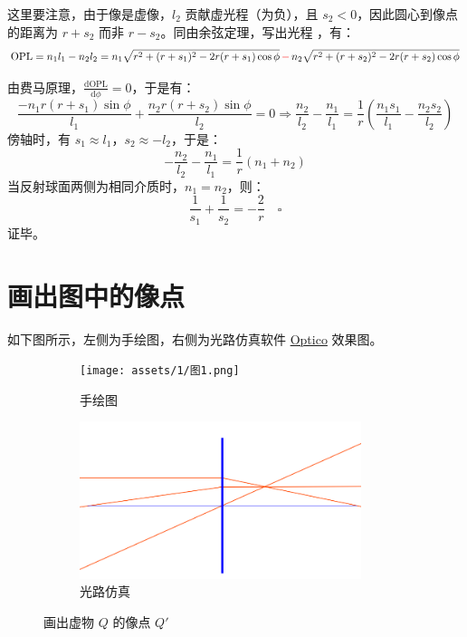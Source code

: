 \documentclass[UTF8]{report}
\theoremstyle{MyLineTheoremStyle} %
\theoremstyle{MyBlockTheoremStyle} %
\theoremstyle{MySubsubsectionStyle} %
\begin{document}
这里要注意，由于像是虚像，$l_2$ 贡献虚光程（为负），且 $s_2<0$，因此圆心到像点的距离为 $r+s_2$ 而非 $r-s_2$。同由余弦定理，写出光程 ，有：
\begin{equation}
\text{OPL} = n_1l_1 - n_2l_2 
=
n_1\sqrt{r^2 + (r+s_1)^2 - 2r(r+s_1)\cos \phi } \,{\color{red} -}\, n_2 \sqrt{r^2 + (r+s_2)^2 - 2r(r+s_2)\cos \phi } 
\end{equation}

由费马原理，$\frac{\mathrm{d} \text{OPL}  }{\mathrm{d} \phi } = 0$，于是有：
\begin{equation}
\frac{-n_1r(r+s_1)\sin \phi }{l_1} + \frac{n_2r(r+s_2)\sin \phi }{l_2} = 0 
\Longrightarrow 
\frac{n_2}{l_2} - \frac{n_1}{l_1} = \frac{1}{r}\left( \frac{n_1s_1}{l_1} - \frac{n_2s_2}{l_2} \right)
\end{equation}
傍轴时，有 $s_1 \approx l_1$，$s_2 \approx -l_2$，于是：
\begin{equation}
-\frac{n_2}{l_2} - \frac{n_1}{l_1} = \frac{1}{r}(n_1 + n_2)
\end{equation}
当反射球面两侧为相同介质时，$n_1 = n_2$，则：
\begin{equation}
\frac{1}{s_1} + \frac{1}{s_2} = -\frac{2}{r}  \quad\square
\end{equation}
证毕。

\section{画出图中的像点}
如下图所示，左侧为手绘图，右侧为光路仿真软件 \href{https://www.optico.app/en/start-en/}{Optico} 效果图。

\begin{figure}[H]\centering
\begin{subfigure}[t]{0.47\textwidth}\centering
    \texttt{[image: assets/1/图1.png]}
    \caption{ 手绘图 }
\end{subfigure}\begin{subfigure}[t]{0.52\textwidth}\centering
    \includegraphics[height=130pt]{assets/1/1.png}
    \caption{ 光路仿真 }
\end{subfigure}
\caption{ 画出虚物 $Q$ 的像点 $Q'$}
\end{figure}
\end{document}
